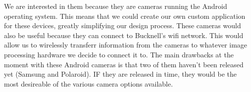 \documentclass{article}
\begin{document}
We are interested in them because they are cameras running the Android operating system. This means that we could create our own custom application for these devices, greatly simplifying our design process. These cameras would also be useful because they can connect to Bucknell's wifi network. This would allow us to wirelessly transferr information from the cameras to whatever image processing hardware we decide to connect it to. The main drawbacks at the moment with these Android cameras is that two of them haven't been released yet (Samsung and Polaroid). IF they are released in time, they would be the most desireable of the various camera options available.





\end{document}
